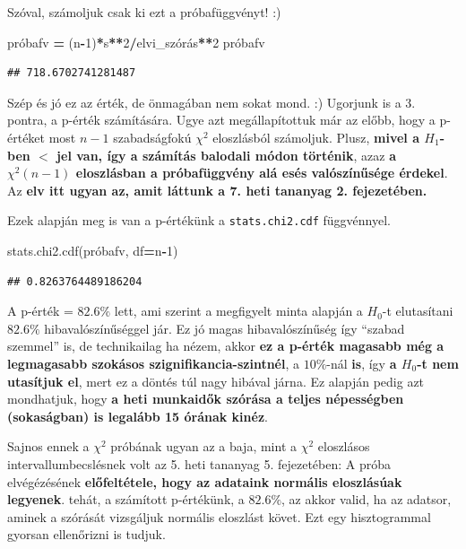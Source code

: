 \documentclass[
]{book}
\newenvironment{Shaded}{\begin{snugshade}}{\end{snugshade}}
\newcommand{\DecValTok}[1]{\textcolor[rgb]{0.00,0.00,0.81}{#1}}
\newcommand{\NormalTok}[1]{#1}
\newcommand{\OperatorTok}[1]{\textcolor[rgb]{0.81,0.36,0.00}{\textbf{#1}}}
\begin{document}
Szóval, számoljuk csak ki ezt a próbafüggvényt! :)

\begin{Shaded}
\begin{Highlighting}[]
\NormalTok{próbafv }\OperatorTok{=}\NormalTok{ (n}\OperatorTok{{-}}\DecValTok{1}\NormalTok{)}\OperatorTok{*}\NormalTok{s}\OperatorTok{**}\DecValTok{2}\OperatorTok{/}\NormalTok{elvi\_szórás}\OperatorTok{**}\DecValTok{2}
\NormalTok{próbafv}
\end{Highlighting}
\end{Shaded}

\begin{verbatim}
## 718.6702741281487
\end{verbatim}

Szép és jó ez az érték, de önmagában nem sokat mond. :) Ugorjunk is a 3. pontra, a p-érték számítására. Ugye azt megállapítottuk már az előbb, hogy a p-értéket most \(n-1\) szabadságfokú \(\chi^2\) eloszlásból számoljuk. Plusz, \textbf{mivel a \(H_1\)-ben \(<\) jel van, így a számítás balodali módon történik}, azaz \textbf{a \(\chi^2(n-1)\) eloszlásban a próbafüggvény alá esés valószínűsége érdekel}. Az \textbf{elv itt ugyan az, amit láttunk a 7. heti tananyag 2. fejezetében.}

Ezek alapján meg is van a p-értékünk a \texttt{stats.chi2.cdf} függvénnyel.

\begin{Shaded}
\begin{Highlighting}[]
\NormalTok{stats.chi2.cdf(próbafv, df}\OperatorTok{=}\NormalTok{n}\OperatorTok{{-}}\DecValTok{1}\NormalTok{)}
\end{Highlighting}
\end{Shaded}

\begin{verbatim}
## 0.8263764489186204
\end{verbatim}

A p-érték = \(82.6\%\) lett, ami szerint a megfigyelt minta alapján a \(H_0\)-t elutasítani \(82.6\%\) hibavalószínűséggel jár. Ez jó magas hibavalószínűség így ``szabad szemmel'' is, de technikailag ha nézem, akkor \textbf{ez a p-érték magasabb még a legmagasabb szokásos szignifikancia-szintnél}, a \(10\%\)-nál \textbf{is}, így \textbf{a \(H_0\)-t nem utasítjuk el}, mert ez a döntés túl nagy hibával járna. Ez alapján pedig azt mondhatjuk, hogy \textbf{a heti munkaidők szórása a teljes népességben (sokaságban) is legalább 15 órának kinéz}.

Sajnos ennek a \(\chi^2\) próbának ugyan az a baja, mint a \(\chi^2\) eloszlásos intervallumbecslésnek volt az 5. heti tananyag 5. fejezetében: A próba elvégézésének \textbf{előfeltétele, hogy az adataink normális eloszlásúak legyenek}. tehát, a számított p-értékünk, a \(82.6\%\), az akkor valid, ha az adatsor, aminek a szórását vizsgáljuk normális eloszlást követ.
Ezt egy hisztogrammal gyorsan ellenőrizni is tudjuk.
\end{document}
